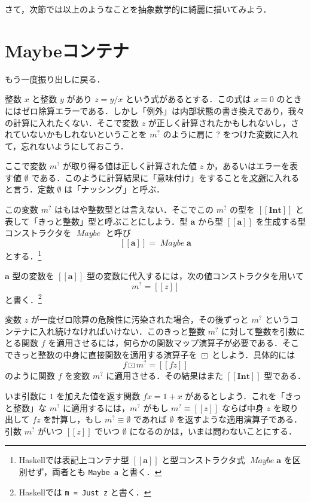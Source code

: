 \documentclass[a4paper,draft]{jsbook}
\def\[{\left[\!\left[}
\def\]{\right]\!\right]}
\newcommand{\programminglanguage}[1]{\textsf{#1}}
\newcommand{\haskell}{\programminglanguage{Haskell}}
\newcommand{\keyword}[1]{{\underline{\emph{#1}}}}
\newcommand{\code}[1]{\texttt{#1}}
\newcommand{\mType}[1]{\mathbf{#1}}
\newcommand{\mIntType}{\mType{Int}}
\newcommand{\mMaybeType}[1]{\[\mType{#1}\]}
\newcommand{\mTypeConstructor}[1]{\mathit{#1}} %
\newcommand{\mNothing}{\emptyset}
\newcommand{\mMaybeWith}[1]{\[#1\]}
\newcommand{\mMaybe}[1]{{#1}^\text{?}}
\DeclareMathOperator{\mMapMaybe}{\boxdot}
\DeclareMathOperator{\mMaybeTypeConstructor}{\mTypeConstructor{Maybe}}
\begin{document}
さて，次節では以上のようなことを抽象数学的に綺麗に描いてみよう．

\section{Maybeコンテナ}

もう一度振り出しに戻る．

整数 $x$ と整数 $y$ があり $z=y/x$ という式があるとする．この式は $x\equiv0$ のときにはゼロ除算エラーである．しかし「例外」は内部状態の書き換えであり，我々の計算に入れたくない．そこで変数 $z$ が正しく計算されたかもしれないし，されていないかもしれないということを $\mMaybe{m}$ のように肩に ? をつけた変数に入れて，忘れないようにしておこう．

ここで変数 $\mMaybe{m}$ が取り得る値は正しく計算された値 $z$ か，あるいはエラーを表す値 $\mNothing$ である．このように計算結果に「意味付け」をすることを\keyword{文脈}に入れると言う．定数 $\mNothing$ は「ナッシング」と呼ぶ．

この変数 $\mMaybe{m}$ はもはや整数型とは言えない．そこでこの $\mMaybe{m}$ の型を $\mMaybeType{\mIntType}$ と表して「きっと整数」型と呼ぶことにしよう．型 $\mType{a}$ から型 $\mMaybeType{a}$ を生成する型コンストラクタを $\mMaybeTypeConstructor$ と呼び
\begin{equation}
\mMaybeType{a}=\mMaybeTypeConstructor\mType{a}
\end{equation}
とする．\footnote{\haskell では表記上コンテナ型 $\mMaybeType{a}$ と型コンストラクタ式 $\mMaybeTypeConstructor\mType{a}$ を区別せず，両者とも \code{Maybe a} と書く．}

$\mType{a}$ 型の変数を $\mMaybeType{a}$ 型の変数に代入するには，次の値コンストラクタを用いて
\begin{equation}
\mMaybe{m}=\mMaybeWith{z}
\end{equation}
と書く．\footnote{\haskell では \code{m = Just z} と書く．}

変数 $z$ が一度ゼロ除算の危険性に汚染された場合，その後ずっと $\mMaybe{m}$ というコンテナに入れ続けなければいけない．このきっと整数 $\mMaybe{m}$ に対して整数を引数にとる関数 $f$ を適用させるには，何らかの関数マップ演算子が必要である．そこできっと整数の中身に直接関数を適用する演算子を $\mMapMaybe$ としよう．具体的には
\begin{equation}
f\mMapMaybe\mMaybe{m}=\mMaybeWith{fz}
\end{equation}
のように関数 $f$ を変数 $\mMaybe{m}$ に適用させる．その結果はまた $\mMaybeType{Int}$ 型である．

いま引数に $1$ を加えた値を返す関数 $fx=1+x$ があるとしよう．これを「きっと整数」な $\mMaybe{m}$ に適用するには，$\mMaybe{m}$ がもし $\mMaybe{m}\equiv\mMaybeWith{z}$ ならば中身 $z$ を取り出して $fz$ を計算し，もし $\mMaybe{m}\equiv\mNothing$ であれば $\mNothing$ を返すような適用演算子である．引数 $\mMaybe{m}$ がいつ $\mMaybeWith{z}$ でいつ $\mNothing$ になるのかは，いまは問わないことにする．
\end{document}
